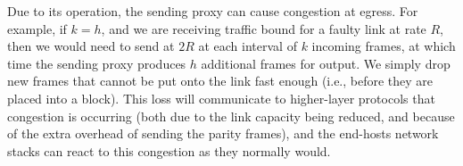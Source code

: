 Due to its operation, the sending proxy can cause congestion at egress.
For example, if $k = h$, and we are receiving traffic bound for
a faulty link at rate $R$, then we would need to send at $2R$ at each interval
of $k$ incoming frames, at which time the sending proxy produces $h$ additional
frames for output. We simply drop new frames that cannot be put onto the link
fast enough (i.e., before they are placed into a block).
This loss will communicate to higher-layer protocols that congestion
is occurring (both due to the link capacity being reduced, and
because of the extra overhead of sending the parity frames), and the
end-hosts network stacks can react to this congestion as they
normally would.


